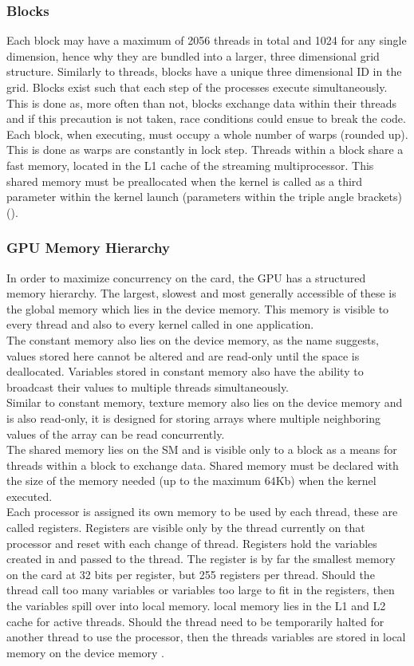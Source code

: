 \subsubsection{Blocks}\label{soft:ssec:block}
Each block may have a maximum of 2056 threads in total and 1024 for any single dimension, hence why they are bundled into a larger, three dimensional grid structure. Similarly to threads, blocks have a unique three dimensional ID in the grid. Blocks exist such that each step of the processes execute simultaneously. This is done as, more often than not, blocks exchange data within their threads and if this precaution is not taken, race conditions could ensue to break the code. Each block, when executing, must occupy a whole number of warps (rounded up). This is done as warps are constantly in lock step. Threads within a block share a fast memory, located in the L1 cache of the streaming multiprocessor. This shared memory must be preallocated when the kernel is called as a third parameter within the kernel launch (parameters within the triple angle brackets) (\cite{CUDA_DEVKIT}).
%
\subsubsection{GPU Memory Hierarchy}
In order to maximize concurrency on the card, the GPU has a structured memory hierarchy. The largest, slowest and most generally accessible of these is the global memory which lies in the device memory. This memory is visible to every thread and also to every kernel called in one application. 
\\
The constant memory also lies on the device memory, as the name suggests, values stored here cannot be altered and are read-only until the space is deallocated. Variables stored in constant memory also have the ability to broadcast their values to multiple threads simultaneously.
\\
Similar to constant memory, texture memory also lies on the device memory and is also read-only, it is designed for storing arrays where multiple neighboring values of the array can be read concurrently.
\\
The shared memory lies on the SM and is visible only to a block as a means for threads within a block to exchange data. Shared memory must be declared with the size of the memory needed (up to the maximum $64$Kb) when the kernel executed.
\\
Each processor is assigned its own memory to be used by each thread, these are called registers. Registers are visible only by the thread currently on that processor and reset with each change of thread. Registers hold the variables created in and passed to the thread. The register is by far the smallest memory on the card at 32 bits per register, but 255 registers per thread. Should the thread call too many variables or variables too large to fit in the registers, then the variables spill over into local memory. local memory lies in the L1 and L2 cache for active threads. Should the thread need to be temporarily halted for another thread to use the processor, then the threads variables are stored in local memory on the device memory \citep{CUDA_DEVKIT}.
%
